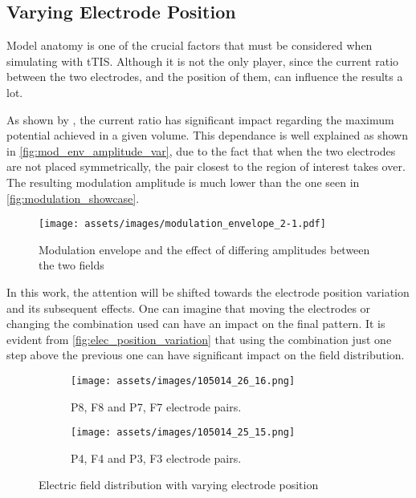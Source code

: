 \subsection{Varying Electrode Position}
\label{subsec:varying_electrode_position}

Model anatomy is one of the crucial factors that must be considered when simulating with \gls{tTIS}. Although it is not the only player, since the current ratio between the two electrodes, and the position of them, can influence the results a lot.

As shown by , the current ratio has significant impact regarding the maximum potential achieved in a given volume. This dependance is well explained as shown in \autoref{fig:mod_env_amplitude_var}, due to the fact that when the two electrodes are not placed symmetrically, the pair closest to the region of interest takes over. The resulting modulation amplitude is much lower than the one seen in \autoref{fig:modulation_showcase}.

\begin{figure}[H]
    \centering
    \texttt{[image: assets/images/modulation\_envelope\_2-1.pdf]}
    \caption{Modulation envelope and the effect of differing amplitudes between the two fields}
    \label{fig:mod_env_amplitude_var}
\end{figure}

In this work, the attention will be shifted towards the electrode position variation and its subsequent effects. One can imagine that moving the electrodes or changing the combination used can have an impact on the final pattern. It is evident from \autoref{fig:elec_position_variation} that using the combination just one step above the previous one can have significant impact on the field distribution.

\begin{figure}[H]
    \centering
    \begin{subfigure}[b]{0.49\textwidth}
        \texttt{[image: assets/images/105014\_26\_16.png]}
        \caption{P8, F8 and P7, F7 electrode pairs.}
        \label{fig:26_16_elec_pair}
    \end{subfigure}
    \begin{subfigure}[b]{0.49\textwidth}
        \texttt{[image: assets/images/105014\_25\_15.png]}
        \caption{P4, F4 and P3, F3 electrode pairs.}
        \label{fig:25_15_elec_pair}
    \end{subfigure}
    \caption{Electric field distribution with varying electrode position}
    \label{fig:elec_position_variation}
\end{figure}

